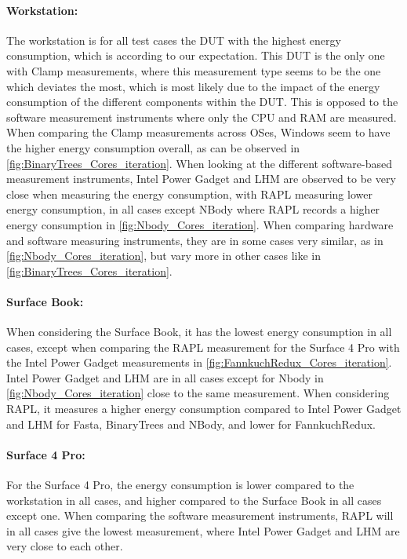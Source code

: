 \paragraph{Workstation:} The workstation is for all test cases the DUT with the highest energy consumption, which is according to our expectation. This DUT is the only one with Clamp measurements, where this measurement type seems to be the one which deviates the most, which is most likely due to the impact of the energy consumption of the different components within the DUT. This is opposed to the software measurement instruments where only the CPU and RAM are measured. When comparing the Clamp measurements across OSes, Windows seem to have the higher energy consumption overall, as can be observed in \cref{fig:BinaryTrees_Cores_iteration}. When looking at the different software-based measurement instruments, Intel Power Gadget and LHM are observed to be very close when measuring the energy consumption, with RAPL measuring lower energy consumption, in all cases except NBody where RAPL records a higher energy consumption in \cref{fig:Nbody_Cores_iteration}. When comparing hardware and software measuring instruments, they are in some cases very similar, as in \cref{fig:Nbody_Cores_iteration}, but vary more in other cases like in \cref{fig:BinaryTrees_Cores_iteration}.

\paragraph{Surface Book:} When considering the Surface Book, it has the lowest energy consumption in all cases, except when comparing the RAPL measurement for the Surface 4 Pro with the Intel Power Gadget measurements in \cref{fig:FannkuchRedux_Cores_iteration}. Intel Power Gadget and LHM are in all cases except for Nbody in \cref{fig:Nbody_Cores_iteration} close to the same measurement. When considering RAPL, it measures a higher energy consumption compared to Intel Power Gadget and LHM for Fasta, BinaryTrees and NBody, and lower for FannkuchRedux.

\paragraph{Surface 4 Pro:} For the Surface 4 Pro, the energy consumption is lower compared to the workstation in all cases, and higher compared to the Surface Book in all cases except one. When comparing the software measurement instruments, RAPL will in all cases give the lowest measurement, where Intel Power Gadget and LHM are very close to each other.



